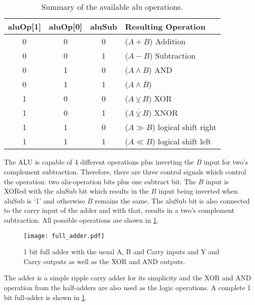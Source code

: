 \subsection{}
\begin{table}
  \centering
  \renewcommand{\arraystretch}{1.25}
  \caption{Summary of the available alu operations.}
  \label{tab:aluOp}
  \begin{tabularx}{.8\textwidth}{ |c|c|c||X| }
    \hline
    aluOp[1] & aluOp[0] & aluSub & Resulting Operation             \\\hline\hline
    0        & 0        & 0      & ($A + B$) Addition              \\\hline
    0        & 0        & 1      & ($A - B$) Subtraction           \\\hline
    0        & 1        & 0      & ($A \land B$) AND               \\\hline
    0        & 1        & 1      & ($A \land \overline{B}$)        \\\hline
    1        & 0        & 0      & ($A \veebar B$) XOR             \\\hline
    1        & 0        & 1      & ($\overline{A \veebar B}$) XNOR \\\hline
    1        & 1        & 0      & ($A \gg B$) logical shift right \\\hline
    1        & 1        & 1      & ($A \ll B$) logical shift left  \\\hline
  \end{tabularx}
\end{table}
The \gls{ALU} is capable of 4 different operations plus inverting the $B$ input for two's complement subtraction.
Therefore, there are three control signals which control the operation: two alu-operation bits plus one subtract bit.
The $B$ input is XORed with the aluSub bit which results in the $B$ input being inverted when aluSub is `1' and otherwise $B$ remains the same.
The aluSub bit is also connected to the carry input of the adder and with that, results in a two's complement subtraction.
All possible operations are shown in \cref{tab:aluOp}.
\begin{figure}[t]
  \centering
  \texttt{[image: full\_adder.pdf]}
  \caption{1 bit full adder with the usual A, B and Carry inputs and Y and Carry outputs as well as the XOR and AND outputs.}
  \label{fig:full_adder}
\end{figure}
The adder is a simple ripple carry adder for its simplicity and the XOR and AND operation from the half-adders are also used as the logic operations.
A complete 1 bit full-adder is shown in \cref{fig:full_adder}.

